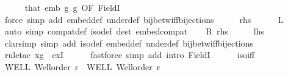 \begin{isabellebody}
\ \ \ \ \isamarkupfalse%
\ that\ emb\ g\ g\ {\isacharbrackleft}{\kern0pt}OF\ FieldI{}{\isacharbrackright}{\kern0pt}\ %
\isanewline
\ \ \ \ \isamarkupfalse%
\ {\isacharparenleft}{\kern0pt}force\ simp\ add{\isacharcolon}{\kern0pt}\ embed{\isacharunderscore}{\kern0pt}def\ under{\isacharunderscore}{\kern0pt}def\ bij{\isacharunderscore}{\kern0pt}betw{\isacharunderscore}{\kern0pt}iff{\isacharunderscore}{\kern0pt}bijections{\isacharparenright}{\kern0pt}\isanewline
\ \ \isamarkupfalse%
\ \isamarkupfalse%
\ {\isacharquery}{\kern0pt}rhs\isanewline
\ \ \ \ \isamarkupfalse%
\ L\ \isamarkupfalse%
\ {\isacharparenleft}{\kern0pt}auto\ simp{\isacharcolon}{\kern0pt}\ compat{\isacharunderscore}{\kern0pt}def\ iso{\isacharunderscore}{\kern0pt}def\ dest{\isacharcolon}{\kern0pt}\ embed{\isacharunderscore}{\kern0pt}compat{\isacharparenright}{\kern0pt}\isanewline
{}\isamarkupfalse%
\isanewline
\ \ \isamarkupfalse%
\ R{\isacharcolon}{\kern0pt}\ {\isacharquery}{\kern0pt}rhs\isanewline
\ \ \isamarkupfalse%
\ \isamarkupfalse%
\ {\isacharquery}{\kern0pt}lhs\isanewline
\ \ \ \ \isamarkupfalse%
\ {\isacharparenleft}{\kern0pt}clarsimp\ simp\ add{\isacharcolon}{\kern0pt}\ iso{\isacharunderscore}{\kern0pt}def\ embed{\isacharunderscore}{\kern0pt}def\ under{\isacharunderscore}{\kern0pt}def\ bij{\isacharunderscore}{\kern0pt}betw{\isacharunderscore}{\kern0pt}iff{\isacharunderscore}{\kern0pt}bijections{\isacharparenright}{\kern0pt}\isanewline
\ \ \ \ \isamarkupfalse%
\ {\isacharparenleft}{\kern0pt}rule{\isacharunderscore}{\kern0pt}tac\ x{\isacharequal}{\kern0pt}{\isachardoublequoteopen}g{\isachardoublequoteclose}\ \ exI{\isacharparenright}{\kern0pt}\isanewline
\ \ \ \ \isamarkupfalse%
\ {\isacharparenleft}{\kern0pt}fastforce\ simp\ add{\isacharcolon}{\kern0pt}\ intro{\isacharcolon}{\kern0pt}\ FieldI{}{\isacharparenright}{\kern0pt}{\isacharplus}{\kern0pt}\isanewline
\ \ \ \ \isamarkupfalse%
\isanewline
{}\isamarkupfalse%
%
\endisatagproof
{\isafoldproof}%
%
\isadelimproof
\isanewline
%
\endisadelimproof
\isanewline
{}\isamarkupfalse%
\ iso{\isacharunderscore}{\kern0pt}iff{}{\isacharcolon}{\kern0pt}\isanewline
{}\ WELL{\isacharcolon}{\kern0pt}\ {\isachardoublequoteopen}Well{\isacharunderscore}{\kern0pt}order\ r{\isachardoublequoteclose}\ \ WELL{\isacharprime}{\kern0pt}{\isacharcolon}{\kern0pt}\ {\isachardoublequoteopen}Well{\isacharunderscore}{\kern0pt}order\ r{\isacharprime}{\kern0pt}{\isachardoublequoteclose}\isanewline

\end{isabellebody}
